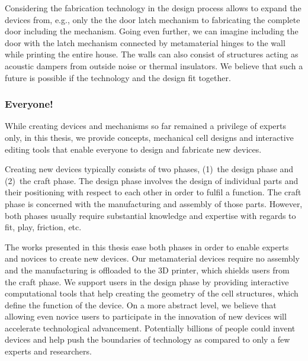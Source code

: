 Considering the fabrication technology in the design process allows to expand the devices from, e.g., only the the door latch mechanism to fabricating the complete door including the mechanism. Going even further, we can imagine including the door with the latch mechanism connected by metamaterial hinges to the wall while printing the entire house. The walls can also consist of structures acting as acoustic dampers from outside noise or thermal insulators. We believe that such a future is possible if the technology and the design fit together.






\subsubsection{Everyone!}
While creating devices and mechanisms so far remained a privilege of experts only, in this thesis, we provide concepts, mechanical cell designs and interactive editing tools that enable everyone to design and fabricate new devices. 

Creating new devices typically consists of two phases, (1)~the design phase and (2)~the craft phase. The design phase involves the design of individual parts and their positioning with respect to each other in order to fulfil a function. The craft phase is concerned with the manufacturing and assembly of those parts. However, both phases usually require substantial knowledge and expertise with regards to fit, play, friction, etc. 

The works presented in this thesis ease both phases in order to enable experts and novices to create new devices. Our metamaterial devices require no assembly and the manufacturing is offloaded to the 3D printer, which shields users from the craft phase. We support users in the design phase by providing interactive computational tools that help creating the geometry of the cell structures, which define the function of the device.
On a more abstract level, we believe that allowing even novice users to participate in the innovation of new devices will accelerate technological advancement. Potentially billions of people could invent devices and help push the boundaries of technology as compared to only a few experts and researchers. 



